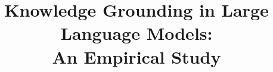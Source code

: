 \documentclass[10pt,conference,a4paper]{IEEEtran}
\title{Knowledge Grounding in Large Language Models: \\ An Empirical Study}
\author{\IEEEauthorblockN{Anonymous Authors}}
\begin{document}
\maketitle{}

\begin{abstract}
	
\end{abstract}














% 


\end{document}
